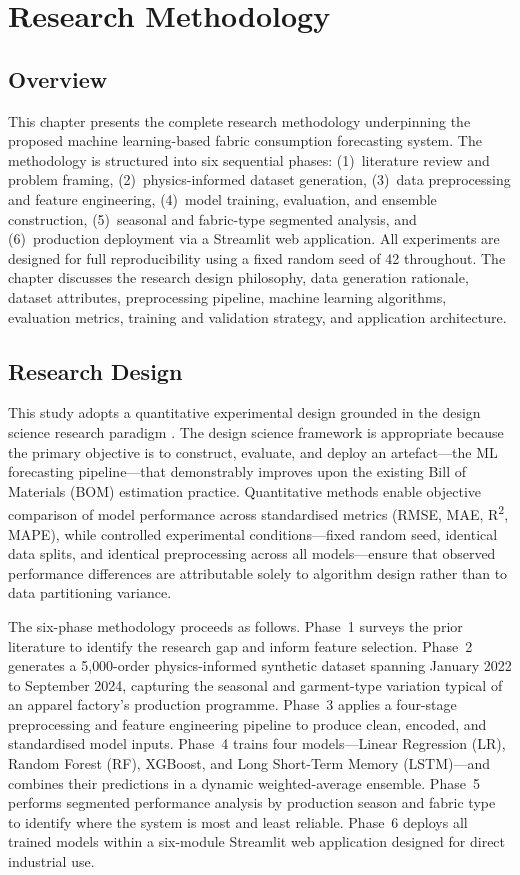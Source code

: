\chapter{Research Methodology}
\label{ch:method}
\sloppy
{}

\section{Overview}
This chapter presents the complete research methodology underpinning the proposed machine learning-based fabric consumption forecasting system. The methodology is structured into six sequential phases: (1)~literature review and problem framing, (2)~physics-informed dataset generation, (3)~data preprocessing and feature engineering, (4)~model training, evaluation, and ensemble construction, (5)~seasonal and fabric-type segmented analysis, and (6)~production deployment via a Streamlit web application. All experiments are designed for full reproducibility using a fixed random seed of 42 throughout. The chapter discusses the research design philosophy, data generation rationale, dataset attributes, preprocessing pipeline, machine learning algorithms, evaluation metrics, training and validation strategy, and application architecture.

\secdiv
\section{Research Design}
This study adopts a quantitative experimental design grounded in the design science research paradigm \cite{hevner2004design}. The design science framework is appropriate because the primary objective is to construct, evaluate, and deploy an artefact---the ML forecasting pipeline---that demonstrably improves upon the existing Bill of Materials (BOM) estimation practice. Quantitative methods enable objective comparison of model performance across standardised metrics (RMSE, MAE, R\textsuperscript{2}, MAPE), while controlled experimental conditions---fixed random seed, identical data splits, and identical preprocessing across all models---ensure that observed performance differences are attributable solely to algorithm design rather than to data partitioning variance.

The six-phase methodology proceeds as follows. Phase~1 surveys the prior literature to identify the research gap and inform feature selection. Phase~2 generates a 5{,}000-order physics-informed synthetic dataset spanning January 2022 to September 2024, capturing the seasonal and garment-type variation typical of an apparel factory's production programme. Phase~3 applies a four-stage preprocessing and feature engineering pipeline to produce clean, encoded, and standardised model inputs. Phase~4 trains four models---Linear Regression (LR), Random Forest (RF), XGBoost, and Long Short-Term Memory (LSTM)---and combines their predictions in a dynamic weighted-average ensemble. Phase~5 performs segmented performance analysis by production season and fabric type to identify where the system is most and least reliable. Phase~6 deploys all trained models within a six-module Streamlit web application designed for direct industrial use.

